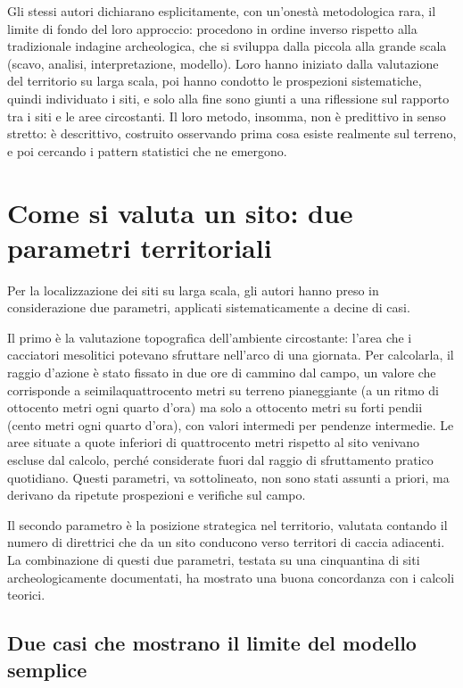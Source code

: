 Gli stessi autori dichiarano esplicitamente, con un'onestà metodologica rara, il limite di fondo del loro approccio: procedono in ordine inverso rispetto alla tradizionale indagine archeologica, che si sviluppa dalla piccola alla grande scala (scavo, analisi, interpretazione, modello). Loro hanno iniziato dalla valutazione del territorio su larga scala, poi hanno condotto le prospezioni sistematiche, quindi individuato i siti, e solo alla fine sono giunti a una riflessione sul rapporto tra i siti e le aree circostanti. Il loro metodo, insomma, non è predittivo in senso stretto: è descrittivo, costruito osservando prima cosa esiste realmente sul terreno, e poi cercando i pattern statistici che ne emergono.

\section{Come si valuta un sito: due parametri territoriali}

Per la localizzazione dei siti su larga scala, gli autori hanno preso in considerazione due parametri, applicati sistematicamente a decine di casi.

Il primo è la valutazione topografica dell'ambiente circostante: l'area che i cacciatori mesolitici potevano sfruttare nell'arco di una giornata. Per calcolarla, il raggio d'azione è stato fissato in due ore di cammino dal campo, un valore che corrisponde a seimilaquattrocento metri su terreno pianeggiante (a un ritmo di ottocento metri ogni quarto d'ora) ma solo a ottocento metri su forti pendii (cento metri ogni quarto d'ora), con valori intermedi per pendenze intermedie. Le aree situate a quote inferiori di quattrocento metri rispetto al sito venivano escluse dal calcolo, perché considerate fuori dal raggio di sfruttamento pratico quotidiano. Questi parametri, va sottolineato, non sono stati assunti a priori, ma derivano da ripetute prospezioni e verifiche sul campo.

Il secondo parametro è la posizione strategica nel territorio, valutata contando il numero di direttrici che da un sito conducono verso territori di caccia adiacenti. La combinazione di questi due parametri, testata su una cinquantina di siti archeologicamente documentati, ha mostrato una buona concordanza con i calcoli teorici.

\subsection{Due casi che mostrano il limite del modello semplice}

